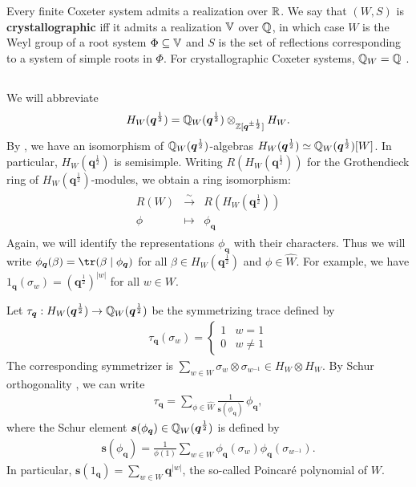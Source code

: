 \documentclass[a4paper,10pt,leqno]{amsart}
\theoremstyle{plain}
\theoremstyle{plain}
\theoremstyle{plain}
\theoremstyle{definition}
\theoremstyle{remark}
\newcommand{\dfemph}[1]{\textbf{#1}}
\newcommand{\Q}{\bm{q}}
\begin{document}
Every finite Coxeter system admits a realization over $\mathbb{R}$.
We say that $(W, S)$ is \dfemph{crystallographic} iff it admits a realization $\mathbb{V}$ over $\mathbb{Q}$, in which case $W$ is the Weyl group of a root system $\Phi \subseteq \mathbb{V}$ and $S$ is the set of reflections corresponding to a system of simple roots in $\Phi$.
For crystallographic Coxeter systems, $\mathbb{Q}_W = \mathbb{Q}$ \cite[Cor.\ 4.8]{springer_1974}.

\subsection{}\label{subsec:hecke-generic}

We will abbreviate
\begin{align}
H_W(\Q^{\frac{1}{2}}) = \bb{Q}_W(\Q^{\frac{1}{2}}) \otimes_{\bb{Z}[\Q^{\pm\frac{1}{2}}]} H_W.
\end{align}
By \cite[Thm.\ 9.3.5]{gp}, we have an isomorphism of $\bb{Q}_W(\Q^{\frac{1}{2}})$-algebras $H_W(\Q^{\frac{1}{2}}) \simeq \bb{Q}_W(\Q^{\frac{1}{2}})[W]$.
In particular, $H_W(\Q^{\frac{1}{2}})$ is semisimple.
Writing $R(H_W(\Q^{\frac{1}{2}}))$ for the Grothendieck ring of $H_W(\Q^{\frac{1}{2}})$-modules, we obtain a ring isomorphism:
\begin{align}
\begin{array}{rcl}
R(W) &\xrightarrow{\sim} &R(H_W(\Q^{\frac{1}{2}}))\\
\phi &\mapsto &\phi_{\Q}
\end{array}
\end{align}
Again, we will identify the representations $\phi_{\Q}$ with their characters.
Thus we will write $\phi_{\Q}(\beta) = \tr(\beta \mid \phi_{\Q})$ for all $\beta \in H_W(\Q^{\frac{1}{2}})$ and $\phi \in \hat{W}$.
For example, we have $1_{\Q}(\sigma_w) = (\Q^{\frac{1}{2}})^{|w|}$ for all $w \in W$.

Let $\tau_{\Q} : H_W(\Q^{\frac{1}{2}}) \to \bb{Q}_W(\Q^{\frac{1}{2}})$ be the symmetrizing trace defined by
\begin{align}
\tau_{\Q}(\sigma_w) = \left\{
\begin{array}{ll}
1	&w = 1\\
0	&w \neq 1
\end{array}\right.
\end{align}
The corresponding symmetrizer is $\sum_{w \in W} \sigma_w \otimes \sigma_{w^{-1}} \in H_W \otimes H_W$.
By Schur orthogonality \cite[Cor.\ 7.2.4]{gp}, we can write 
\begin{align}\label{eq:schur}
\tau_{\Q} = \sum_{\phi \in \hat{W}}
\frac{1}{\bm{s}(\phi_{\Q})}\,\phi_{\Q},
\end{align}
where the Schur element $\bm{s}(\phi_{\Q}) \in \bb{Q}_W(\Q^{\frac{1}{2}})$ is defined by
\begin{align}
\bm{s}(\phi_{\Q}) = \frac{1}{\phi(1)} \sum_{w \in W} \phi_{\Q}(\sigma_w)\phi_{\Q}(\sigma_{w^{-1}}).
\end{align}
In particular, $\bm{s}(1_{\Q}) = \sum_{w \in W} \Q^{|w|}$, the so-called Poincar\'e polynomial of $W$.
\end{document}
